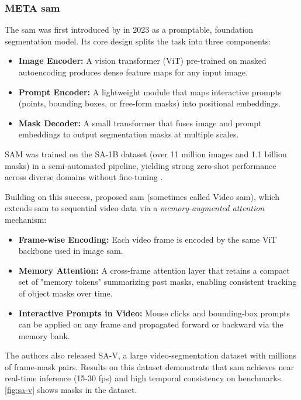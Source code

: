 \subsubsection{META \acrlong{sam}}
\label{ssec:meta_sam2}
The \acrfull{sam} was first introduced by \textcite{kirillov_segment_2023} in 2023 as a promptable, foundation segmentation model. Its core design splits the task into three components:
\begin{itemize}
    \item \textbf{Image Encoder:} A vision transformer (ViT) pre-trained on masked autoencoding produces dense feature maps for any input image.
    \item \textbf{Prompt Encoder:} A lightweight module that maps interactive prompts (points, bounding boxes, or free-form masks) into positional embeddings.
    \item \textbf{Mask Decoder:} A small transformer that fuses image and prompt embeddings to output segmentation masks at multiple scales.
\end{itemize}
SAM was trained on the SA-1B dataset (over 11 million images and 1.1 billion masks) in a semi-automated pipeline, yielding strong zero-shot performance across diverse domains without fine-tuning \cite{ravi_sam_nodate}.

Building on this success, \textcite{ravi_sam_nodate} proposed \acrfull{sam} (sometimes called Video \acrshort{sam}), which extends \acrshort{sam} to sequential video data via a \emph{memory-augmented attention} mechanism:
\begin{itemize}
    \item \textbf{Frame-wise Encoding:} Each video frame is encoded by the same ViT backbone used in image \acrshort{sam}.
    \item \textbf{Memory Attention:} A cross-frame attention layer that retains a compact set of "memory tokens" summarizing past masks, enabling consistent tracking of object masks over time.
    \item \textbf{Interactive Prompts in Video:} Mouse clicks and bounding-box prompts can be applied on any frame and propagated forward or backward via the memory bank.
\end{itemize}

The authors also released SA-V, a large video-segmentation dataset with millions of frame-mask pairs. Results on this dataset demonstrate that \acrshort{sam} achieves near real-time inference (15-30 fps) and high temporal consistency on benchmarks. \cref{fig:sa-v} shows masks in the dataset. 

